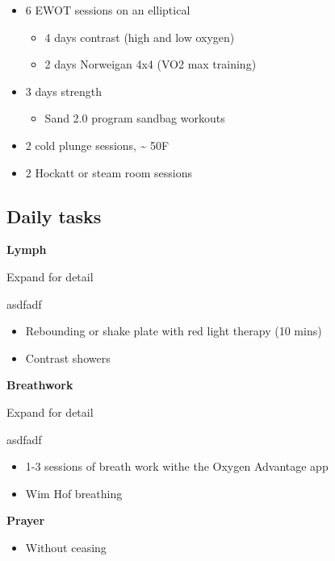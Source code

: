 \documentclass[
  letterpaper,
  DIV=11,
  numbers=noendperiod]{scrreprt}
\providecommand{\tightlist}{%
  \setlength{\itemsep}{0pt}\setlength{\parskip}{0pt}}\usepackage{longtable,booktabs,array}
\begin{document}
\begin{itemize}
\item
  6 EWOT sessions on an elliptical

  \begin{itemize}
  \item
    4 days contrast (high and low oxygen)
  \item
    2 days Norweigan 4x4 (VO2 max training)
  \end{itemize}
\item
  3 days strength

  \begin{itemize}
  \tightlist
  \item
    Sand 2.0 program sandbag workouts
  \end{itemize}
\item
  2 cold plunge sessions, \textasciitilde{} 50F
\item
  2 Hockatt or steam room sessions
\end{itemize}

\subsection*{Daily tasks}\label{daily-tasks}

\textbf{Lymph}

Expand for detail

asdfadf

\begin{itemize}
\item
  Rebounding or shake plate with red light therapy (10 mins)
\item
  Contrast showers
\end{itemize}

\textbf{Breathwork}

Expand for detail

asdfadf

\begin{itemize}
\item
  1-3 sessions of breath work withe the Oxygen Advantage app
\item
  Wim Hof breathing
\end{itemize}

\textbf{Prayer}

\begin{itemize}
\tightlist
\item
  Without ceasing
\end{itemize}
\end{document}
